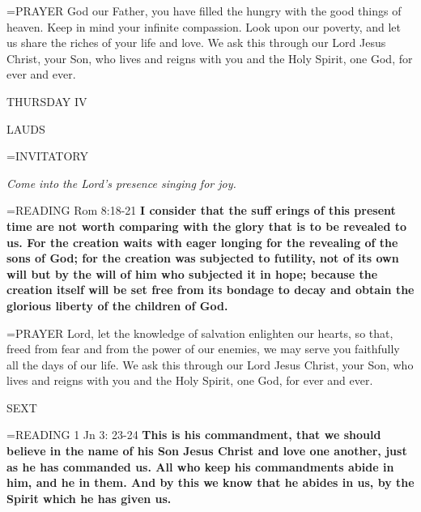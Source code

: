 \hangindent=\parindent \small{PRAYER  God our Father, you have filled the hungry with the good things of heaven. Keep in mind your infinite compassion. Look upon our poverty, and let us share the riches of your life and love.  We ask this through our Lord Jesus Christ, your Son, who lives and reigns with you and the Holy Spirit, one God, for ever and ever.}

\begin{center}
\normalsize THURSDAY IV
\end{center}

\begin{flushleft}\normalsize LAUDS\\\end{flushleft}

\hangindent=\parindent \small{INVITATORY}
\begin{center}
\textit{Come into the Lord’s presence singing for joy.\\}
\end{center}

\hangindent=\parindent \small{READING} Rom 8:18-21 \textbf{I consider that the suff erings of this present time are not worth comparing with the glory that is to be revealed to us. For the creation waits with eager longing for the revealing of the sons of God; for the creation was subjected to futility, not of its own will but by the will of him who subjected it in hope; because the creation itself will be set free from its bondage to decay and obtain the glorious liberty of the children of God.\\}

\hangindent=\parindent \small{PRAYER  Lord, let the knowledge of salvation enlighten our hearts, so that, freed from fear and from the power of our enemies, we may serve you faithfully all the days of our life. We ask this through our Lord Jesus Christ, your Son, who lives and reigns with you and the Holy Spirit, one God, for ever and ever.}

\begin{flushleft}\normalsize SEXT\\\end{flushleft}

\hangindent=\parindent \small{READING} 1 Jn 3: 23-24 \textbf{This is his commandment, that we should believe in the name of his Son Jesus Christ and love one another, just as he has commanded us. All who keep his commandments abide in him, and he in them. And by this we know that he abides in us, by the Spirit which he has given us.}

